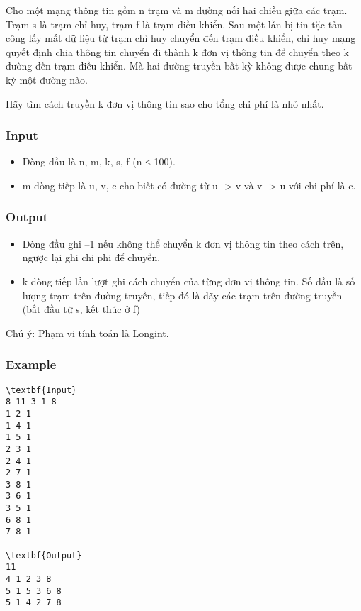 

Cho một mạng thông tin gồm n trạm và m đường nối hai chiều giữa các trạm. Trạm s là trạm chỉ huy, trạm f là trạm điều khiển. Sau một lần bị tin tặc tấn công lấy mất dữ liệu từ trạm chỉ huy chuyển đến trạm điều khiển, chỉ huy mạng quyết định chia thông tin chuyển đi thành k đơn vị thông tin để chuyển theo k đường đến trạm điều khiển. Mà hai đường truyền bất kỳ không được chung bất kỳ một đường nào.


Hãy tìm cách truyền k đơn vị thông tin sao cho tổng chi phí là nhỏ nhất.

\subsubsection{Input}
\begin{itemize}
	\item Dòng đầu là n, m, k, s, f (n ≤ 100).
	\item m dòng tiếp là u, v, c cho biết có đường từ u -> v và v -> u với chi phí là c.
\end{itemize}

\subsubsection{Output}
\begin{itemize}
	\item Dòng đầu ghi –1 nếu không thể chuyển k đơn vị thông tin theo cách trên, ngược lại ghi chi phi để chuyển.
	\item k dòng tiếp lần lượt ghi cách chuyển của từng đơn vị thông tin. Số đầu là số lượng trạm trên đường truyền, tiếp đó là dãy các trạm trên đường truyền (bắt đầu từ s, kết thúc ở f)
\end{itemize}

Chú ý: Phạm vi tính toán là Longint.

\subsubsection{Example}
\begin{verbatim}
\textbf{Input}
8 11 3 1 8
1 2 1
1 4 1
1 5 1
2 3 1
2 4 1
2 7 1
3 8 1
3 6 1
3 5 1
6 8 1
7 8 1

\textbf{Output}
11
4 1 2 3 8
5 1 5 3 6 8
5 1 4 2 7 8

\end{verbatim}
